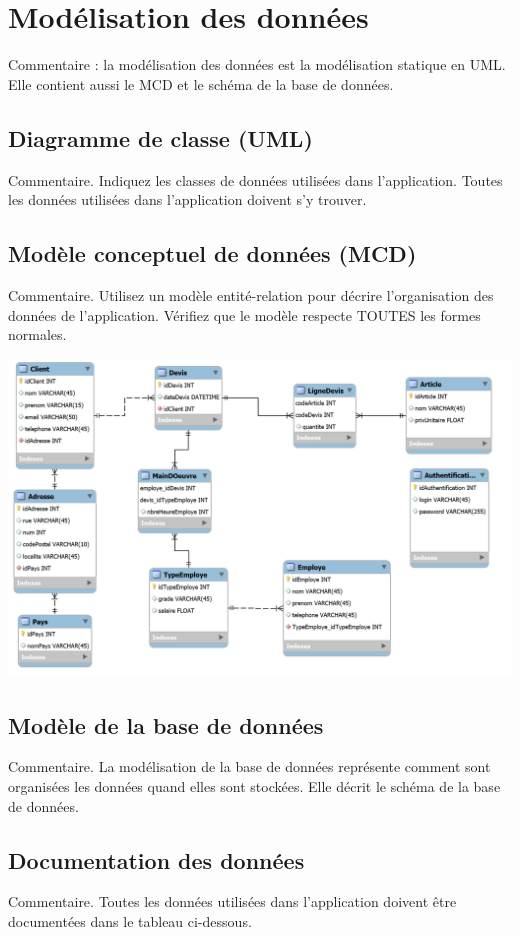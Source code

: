 \section{Modélisation des données}
Commentaire : la modélisation des données est la modélisation statique en UML.  Elle contient aussi le MCD et le schéma de la base de données.

\subsection{Diagramme de classe (UML)}
Commentaire.  Indiquez les classes de données utilisées dans l’application.  Toutes les données utilisées dans l’application doivent s’y trouver.

\subsection{Modèle conceptuel de données (MCD)}
Commentaire.  Utilisez un modèle entité-relation pour décrire l’organisation des données de l’application.  Vérifiez que le modèle respecte TOUTES les formes normales.

\begin{center}
\includegraphics[scale=0.5]{images/projetDevis.png}
\end{center}

\subsection{Modèle de la base de données}
Commentaire.  La modélisation de la base de données représente comment sont organisées les données quand elles sont stockées.  Elle décrit le schéma de la base de données.

\subsection{Documentation des données}
Commentaire.  Toutes les données utilisées dans l’application doivent être documentées dans le tableau ci-dessous.
